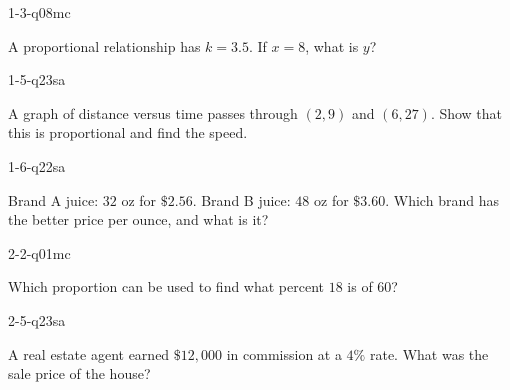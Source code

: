 
\begin{practiceQuestion}{1-3-q08}{mc}
\begin{questionText}
A proportional relationship has $k = 3.5$. If $x = 8$, what is $y$?
\end{questionText}
\end{practiceQuestion}

\begin{practiceQuestion}{1-5-q23}{sa}
\begin{questionText}
A graph of distance versus time passes through $(2, 9)$ and $(6, 27)$. Show that this is proportional and find the speed.
\end{questionText}
\end{practiceQuestion}

\begin{practiceQuestion}{1-6-q22}{sa}
\begin{questionText}
Brand A juice: $32$ oz for $\$2.56$. Brand B juice: $48$ oz for $\$3.60$. Which brand has the better price per ounce, and what is it?
\end{questionText}
\end{practiceQuestion}

\begin{practiceQuestion}{2-2-q01}{mc}
\begin{questionText}
Which proportion can be used to find what percent $18$ is of $60$?
\end{questionText}
\end{practiceQuestion}

\begin{practiceQuestion}{2-5-q23}{sa}
\begin{questionText}
A real estate agent earned $\$12{,}000$ in commission at a $4\%$ rate. What was the sale price of the house?
\end{questionText}
\end{practiceQuestion}

